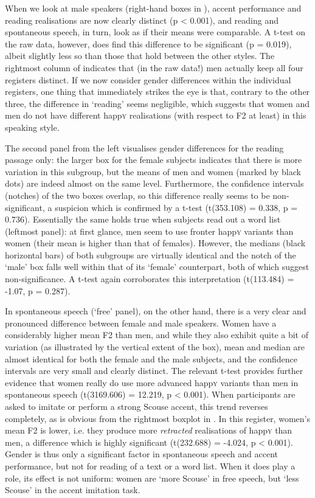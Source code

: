 When we look at male speakers (right-hand boxes in ), accent performance and reading realisations are now clearly distinct (p < 0.001), and reading and spontaneous speech, in turn, look as if their means were comparable.
A t-test on the raw data, however, does find this difference to be significant (p = 0.019), albeit slightly less so than those that hold between the other styles.
The rightmost column of  indicates that (in the raw data!) men actually keep all four registers distinct.
If we now consider gender differences within the individual registers, one thing that immediately strikes the eye is that, contrary to the other three, the difference in `reading' seems negligible, which suggests that women and men do not have different happ\textsc{y} realisations (with respect to F2 at least) in this speaking style.

The second panel from the left visualises gender differences for the reading passage only: the larger box for the female subjects indicates that there is more variation in this subgroup, but the means of men and women (marked by black dots) are indeed almost on the same level.
Furthermore, the confidence intervals (notches) of the two boxes overlap, so this difference really seems to be non-significant, a suspicion which is confirmed by a t-test (t(353.108) = 0.338, p = 0.736).
Essentially the same holds true when subjects read out a word list (leftmost panel): at first glance, men seem to use fronter happ\textsc{y} variants than women (their mean is higher than that of females).
However, the medians (black horizontal bars) of both subgroups are virtually identical and the notch of the `male' box falls well within that of its `female' counterpart, both of which suggest non-significance.
A t-test again corroborates this interpretation (t(113.484) = -1.07, p = 0.287).

In spontaneous speech (`free' panel), on the other hand, there is a very clear and pronounced difference between female and male speakers.
Women have a considerably higher mean F2 than men, and while they also exhibit quite a bit of variation (as illustrated by the vertical extent of the box), mean and median are almost identical for both the female and the male subjects, and the confidence intervals are very small and clearly distinct.
The relevant t-test provides further evidence that women really do use more advanced happ\textsc{y} variants than men in spontaneous speech (t(3169.606) = 12.219, p < 0.001).
When participants are asked to imitate or perform a strong Scouse accent, this trend reverses completely, as is obvious from the rightmost boxplot in .
In this register, women's mean F2 is lower, i.e. they produce more \emph{retracted} realisations of happ\textsc{y} than men, a difference which is highly significant (t(232.688) = -4.024, p < 0.001).
Gender is thus only a significant factor in spontaneous speech and accent performance, but not for reading of a text or a word list.
When it does play a role, its effect is not uniform: women are `more Scouse' in free speech, but `less Scouse' in the accent imitation task.

